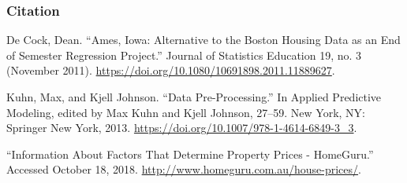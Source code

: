 \documentclass[]{article}
\begin{document}
\hypertarget{citation}{%
\subsubsection{Citation}\label{citation}}

De Cock, Dean. ``Ames, Iowa: Alternative to the Boston Housing Data as
an End of Semester Regression Project.'' Journal of Statistics Education
19, no. 3 (November 2011).
\url{https://doi.org/10.1080/10691898.2011.11889627}.

Kuhn, Max, and Kjell Johnson. ``Data Pre-Processing.'' In Applied
Predictive Modeling, edited by Max Kuhn and Kjell Johnson, 27--59. New
York, NY: Springer New York, 2013.
\url{https://doi.org/10.1007/978-1-4614-6849-3_3}.

``Information About Factors That Determine Property Prices - HomeGuru.''
Accessed October 18, 2018.
\url{http://www.homeguru.com.au/house-prices/}.
\end{document}
